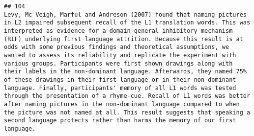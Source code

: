\documentclass[
  english,
  man]{apa6}
\begin{document}
\begin{verbatim}
## 104                                                                                                                                                                                                                                                                                                                                                                                                                                                                                                                                                                                                                                                                                                                                                                                                                                                                                                                                                                                                                                                                                                                                                                                                                                                                                                                                                                                                                                                                                                                                                                                                                                                                     Levy, Mc Veigh, Marful and Andreson (2007) found that naming pictures in L2 impaired subsequent recall of the L1 translation words. This was interpreted as evidence for a domain-general inhibitory mechanism (RIF) underlying first language attrition. Because this result is at odds with some previous findings and theoretical assumptions, we wanted to assess its reliability and replicate the experiment with various groups. Participants were first shown drawings along with their labels in the non-dominant language. Afterwards, they named 75% of these drawings in their first language or in their non-dominant language. Finally, participants' memory of all L1 words was tested through the presentation of a rhyme-cue. Recall of L1 words was better after naming pictures in the non-dominant language compared to when the picture was not named at all. This result suggests that speaking a second language protects rather than harms the memory of our first language.

\end{verbatim}
\end{document}

